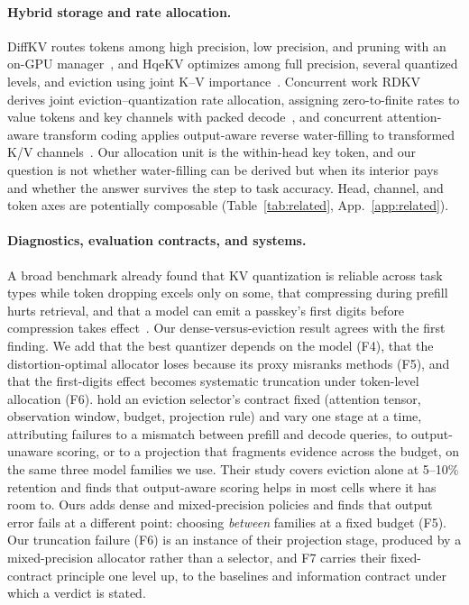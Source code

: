 \documentclass{article}
\theoremstyle{definition}
\begin{document}
\paragraph{Hybrid storage and rate allocation.}
DiffKV routes tokens among high precision, low precision, and pruning with an on-GPU manager~\citep{zhang2025diffkv}, and HqeKV optimizes among full precision, several quantized levels, and eviction using joint K--V importance~\citep{wang-etal-2026-hqekv}.  
Concurrent work RDKV derives joint eviction--quantization rate allocation, assigning zero-to-finite rates to value tokens and key channels with packed decode~\citep{zhang2026rdkv}, and concurrent attention-aware transform coding applies output-aware reverse water-filling to transformed K/V channels~\citep{laus2026aatc}.  
Our allocation unit is the within-head key token, and our question is not whether water-filling can be derived but when its interior pays and whether the answer survives the step to task accuracy. 
Head, channel, and token axes are potentially composable (Table~\ref{tab:related}, App.~\ref{app:related}).

\paragraph{Diagnostics, evaluation contracts, and systems.}
A broad benchmark already found that KV quantization is reliable across task types while token dropping excels only on some, that compressing during prefill hurts retrieval, 
and that a model can emit a passkey's first digits before compression takes effect~\citep{yuan2024kvbench}.  
Our dense-versus-eviction result agrees with the first finding.  We add that the best quantizer depends on the model (F4), that the distortion-optimal allocator loses because its proxy misranks methods (F5), and that the first-digits effect becomes systematic truncation under token-level allocation (F6).
\citet{zhang2026fixedcontract} hold an eviction selector's contract fixed (attention tensor, observation window, budget, projection rule) and vary one stage at a time, attributing failures to a mismatch between prefill and decode queries, to output-unaware scoring, or to a projection that fragments evidence across the budget, on the same three model families we use.  
Their study covers eviction alone at 5--10\% retention and finds that output-aware scoring helps in most cells where it has room to.  
Ours adds dense and mixed-precision policies and finds that output error fails at a different point: 
choosing \emph{between} families at a fixed budget (F5).  
Our truncation failure (F6) is an instance of their projection stage, produced by a mixed-precision allocator rather than a selector, and F7 carries their fixed-contract principle one level up, to the baselines and information contract under which a verdict is stated.
\end{document}
